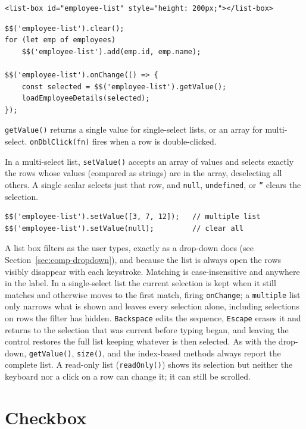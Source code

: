 \begin{lstlisting}[style=html]
<list-box id="employee-list" style="height: 200px;"></list-box>
\end{lstlisting}

\begin{lstlisting}[style=javascript]
$$('employee-list').clear();
for (let emp of employees)
    $$('employee-list').add(emp.id, emp.name);

$$('employee-list').onChange(() => {
    const selected = $$('employee-list').getValue();
    loadEmployeeDetails(selected);
});
\end{lstlisting}

\noindent
\texttt{getValue()} returns a single value for single-select lists, or an array for multi-select.  \texttt{onDblClick(fn)} fires when a row is double-clicked.

\noindent
In a multi-select list, \texttt{setValue()} accepts an array of values and selects exactly the rows whose values (compared as strings) are in the array, deselecting all others.  A single scalar selects just that row, and \texttt{null}, \texttt{undefined}, or \texttt{''} clears the selection.

\begin{lstlisting}[style=javascript]
$$('employee-list').setValue([3, 7, 12]);   // multiple list
$$('employee-list').setValue(null);         // clear all
\end{lstlisting}

A list box filters as the user types, exactly as a drop-down does (see Section~\ref{sec:comp-dropdown}), and because the list is always open the rows visibly disappear with each keystroke.  Matching is case-insensitive and anywhere in the label.  In a single-select list the current selection is kept when it still matches and otherwise moves to the first match, firing \texttt{onChange}; a \texttt{multiple} list only narrows what is shown and leaves every selection alone, including selections on rows the filter has hidden.  \texttt{Backspace} edits the sequence, \texttt{Escape} erases it and returns to the selection that was current before typing began, and leaving the control restores the full list keeping whatever is then selected.  As with the drop-down, \texttt{getValue()}, \texttt{size()}, and the index-based methods always report the complete list.  A read-only list (\texttt{readOnly()}) shows its selection but neither the keyboard nor a click on a row can change it; it can still be scrolled.

\section{Checkbox}
\label{sec:comp-checkbox}

